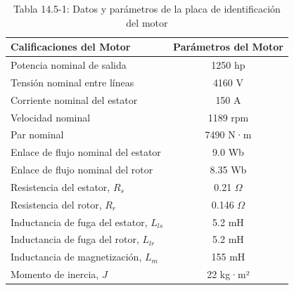 \documentclass[letterpaper,12pt]{article} %
\begin{document}
\begin{table}[ht]
    \centering
    \caption{Tabla 14.5-1: Datos y parámetros de la placa de identificación del motor}
    \begin{tabular}{|l|c|}
        \hline
        \textbf{Calificaciones del Motor} & \textbf{Parámetros del Motor} \\
        \hline
        Potencia nominal de salida & 1250 hp \\
        Tensión nominal entre líneas & 4160 V \\
        Corriente nominal del estator & 150 A \\
        Velocidad nominal & 1189 rpm \\
        Par nominal & 7490 N·m \\
        Enlace de flujo nominal del estator & 9.0 Wb \\
        Enlace de flujo nominal del rotor & 8.35 Wb \\
        \hline
        Resistencia del estator, \( R_s \) & 0.21 \(\Omega\) \\
        Resistencia del rotor, \( R_r \) & 0.146 \(\Omega\) \\
        Inductancia de fuga del estator, \( L_{ls} \) & 5.2 mH \\
        Inductancia de fuga del rotor, \( L_{lr} \) & 5.2 mH \\
        Inductancia de magnetización, \( L_m \) & 155 mH \\
        Momento de inercia, \( J \) & 22 kg·m² \\
        \hline
    \end{tabular}
    \label{tab:14.5-1}
\end{table}
\FloatBarrier
\end{document}
